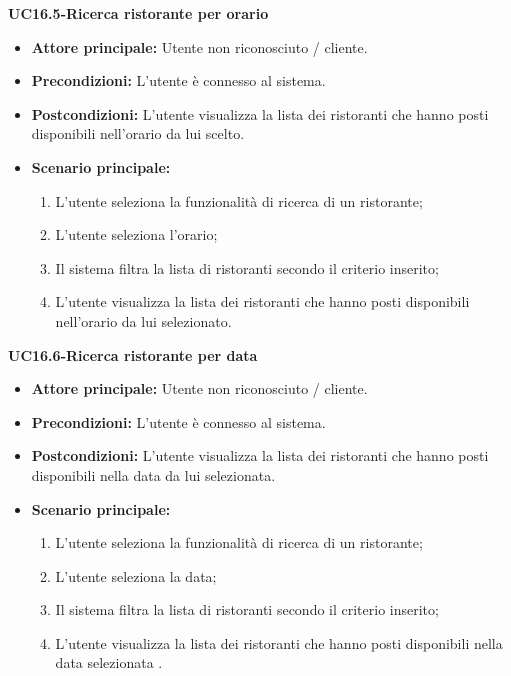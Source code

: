 \textbf{UC16.5-Ricerca ristorante per orario}
\begin{itemize}
\item \textbf{Attore principale: }Utente non riconosciuto / cliente.
\item \textbf{Precondizioni:} L'utente è connesso al sistema.
\item \textbf{Postcondizioni:} L'utente visualizza la lista dei ristoranti che hanno posti disponibili nell'orario
da lui scelto.
\item \textbf{Scenario principale:}
\begin{enumerate}
    \item L'utente seleziona la funzionalità di ricerca di un ristorante;
    \item L'utente seleziona l'orario;
    \item Il sistema filtra la lista di ristoranti secondo il criterio inserito;
    \item L'utente visualizza la lista dei ristoranti che hanno posti disponibili nell'orario da lui
    selezionato.
\end{enumerate}
\end{itemize}

\textbf{UC16.6-Ricerca ristorante per data}
\begin{itemize}
\item \textbf{Attore principale:} Utente non riconosciuto / cliente.
\item \textbf{Precondizioni:} L'utente è connesso al sistema.
\item \textbf{Postcondizioni:} L'utente visualizza la lista dei ristoranti che hanno posti disponibili
nella data da lui selezionata.
\item \textbf{Scenario principale:}
\begin{enumerate}
    \item L'utente seleziona la funzionalità di ricerca di un ristorante;
    \item L'utente seleziona la data;
    \item Il sistema filtra la lista di ristoranti secondo il criterio inserito;
    \item L'utente visualizza la lista dei ristoranti che hanno posti disponibili
    nella data selezionata .
\end{enumerate}
\end{itemize}

